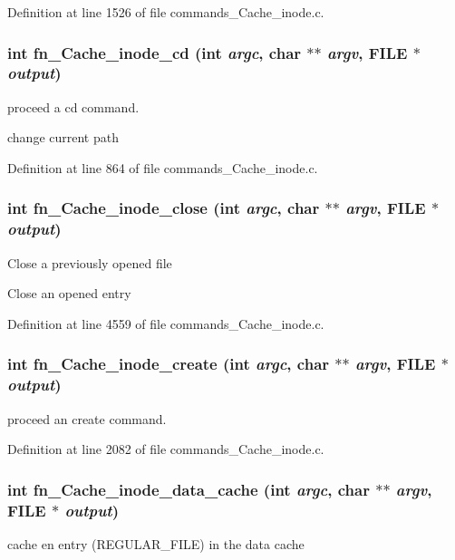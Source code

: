 Definition at line 1526 of file commands\_\-Cache\_\-inode.c.
\subsubsection[{fn\_\-Cache\_\-inode\_\-cd}]{\setlength{\rightskip}{0pt plus 5cm}int fn\_\-Cache\_\-inode\_\-cd (int {\em argc}, \/  char $\ast$$\ast$ {\em argv}, \/  FILE $\ast$ {\em output})}\label{commands_8h_ade5ad3cf431b9c4586c59b909c87c6b9}
proceed a cd command.

change current path 

Definition at line 864 of file commands\_\-Cache\_\-inode.c.
\subsubsection[{fn\_\-Cache\_\-inode\_\-close}]{\setlength{\rightskip}{0pt plus 5cm}int fn\_\-Cache\_\-inode\_\-close (int {\em argc}, \/  char $\ast$$\ast$ {\em argv}, \/  FILE $\ast$ {\em output})}\label{commands_8h_af0ca1153461f207ba7c227ef1563feef}
Close a previously opened file

Close an opened entry 

Definition at line 4559 of file commands\_\-Cache\_\-inode.c.
\subsubsection[{fn\_\-Cache\_\-inode\_\-create}]{\setlength{\rightskip}{0pt plus 5cm}int fn\_\-Cache\_\-inode\_\-create (int {\em argc}, \/  char $\ast$$\ast$ {\em argv}, \/  FILE $\ast$ {\em output})}\label{commands_8h_a6c91f15dff648eb0932a0bd012182818}
proceed an create command. 

Definition at line 2082 of file commands\_\-Cache\_\-inode.c.
\subsubsection[{fn\_\-Cache\_\-inode\_\-data\_\-cache}]{\setlength{\rightskip}{0pt plus 5cm}int fn\_\-Cache\_\-inode\_\-data\_\-cache (int {\em argc}, \/  char $\ast$$\ast$ {\em argv}, \/  FILE $\ast$ {\em output})}\label{commands_8h_a0bdb2b1764b0dfb7ea511b24bb27549c}
cache en entry (REGULAR\_\-FILE) in the data cache 

